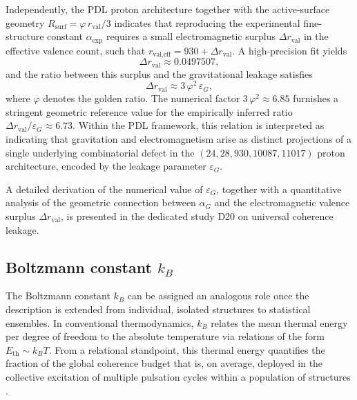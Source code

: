 \documentclass{article}
\begin{document}
Independently, the PDL proton architecture together with the active-surface geometry
$R_{\text{surf}} = \varphi\, r_{\text{val}}/3$ indicates that reproducing the experimental fine-structure constant
$\alpha_{\text{exp}}$ requires a small electromagnetic surplus
$\Delta r_{\text{val}}$ in the effective valence count, such that $r_{\text{val,eff}} = 930 + \Delta r_{\text{val}}$.\cite{Alpha_PDL_v2_2026,Universal_Coherence_Leakage_2026}
A high-precision fit yields
\[
\Delta r_{\text{val}} \approx 0.0497507,
\]
and the ratio between this surplus and the gravitational leakage satisfies
\[
\Delta r_{\text{val}} \approx 3\,\varphi^2\,\varepsilon_G,
\]
where $\varphi$ denotes the golden ratio. The numerical factor
$3\,\varphi^2 \approx 6.85$ furnishes a stringent geometric reference value for the empirically inferred ratio $\Delta r_{\text{val}} / \varepsilon_G \approx 6.73$.
Within the PDL framework, this relation is interpreted as indicating that gravitation and electromagnetism arise as distinct projections of a single underlying combinatorial defect in the $(24,28,930,10087,11017)$ proton architecture, encoded by the leakage parameter $\varepsilon_G$.

A detailed derivation of the numerical value of $\varepsilon_G$, together with a quantitative analysis of the geometric connection between $\alpha_G$ and the electromagnetic valence surplus $\Delta r_{\mathrm{val}}$, is presented in the dedicated study D20 on universal coherence leakage.\citep{Universal_Coherence_Leakage_2026}

\subsection{Boltzmann constant \texorpdfstring{\(k_B\)}{kB}}
\label{subsec:kB}

The Boltzmann constant \(k_B\) can be assigned an analogous role once the description is extended from individual, isolated structures to statistical ensembles. In conventional thermodynamics, \(k_B\) relates the mean thermal energy per degree of freedom to the absolute temperature via relations of the form \(E_{\mathrm{th}} \sim k_B T\). From a relational standpoint, this thermal energy quantifies the fraction of the global coherence budget that is, on average, deployed in the collective excitation of multiple pulsation cycles within a population of structures
\citep{PDL_Main_2026,PDL_position}.
\end{document}
